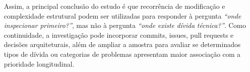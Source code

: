 \documentclass[12pt]{article}
\begin{document}
Assim, a principal conclusão do estudo é que recorrência de modificação e complexidade estrutural podem ser utilizadas para responder à pergunta \emph{``onde inspecionar primeiro?''}, mas não à pergunta \emph{``onde existe dívida técnica?''}. Como continuidade, a investigação pode incorporar commits, issues, pull requests e decisões arquiteturais, além de ampliar a amostra para avaliar se determinados tipos de dívida ou categorias de problemas apresentam maior associação com a prioridade longitudinal.



\end{document}
